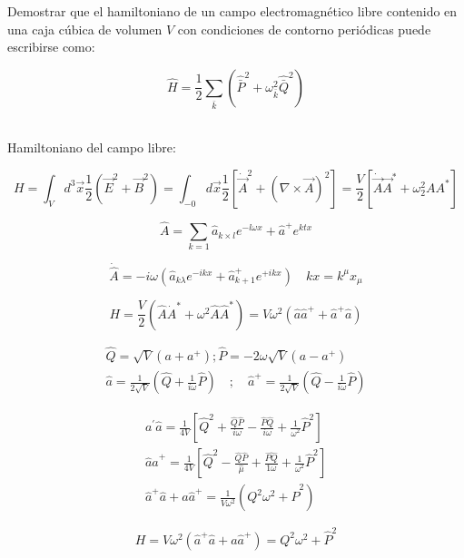 Demostrar  que  el  hamiltoniano  de  un  campo  electromagnético  libre  contenido  en  una  caja  cúbica  de volumen $V$ con condiciones de contorno periódicas puede escribirse como:

$$
\hat{H}=\frac{1}{2} \sum_{\bar{k}}\left(\hat{\bar{P}}^{2}+\omega_{\bar{k}}^{2} \hat{\bar{Q}}^{2}\right)
$$

\begin{solution}\ \\
Hamiltoniano del campo libre:

$$
H=\int_{V} d^{3} \vec{x} \frac{1}{2}\left(\vec{E}^{2}+\vec{B}^{2}\right)=\int_{-0} d \vec{x} \frac{1}{2}\left[\dot{\vec{A}}^{2}+(\nabla \times \vec{A})^{2}\right]=\frac{V}{2}\left[\dot{\vec{A}} \vec{A}^{*}+\omega_{2}^{2} A A^{*}\right]
$$

$$
\widehat{A}=\sum_{k=1} \hat{a}_{k \times l} e^{-l \omega x}+\hat{a}^{+} e^{k t x}
$$

$$
\dot{\hat{A}}=-i \omega\left(\hat{a}_{k \lambda} e^{-i k x}+\hat{a}_{k+1}^{+} e^{+i k x}\right) \quad k x=k^{\mu} x_{\mu}
$$

$$
H=\frac{V}{2}\left(\hat{A} \dot{A}^{*}+\omega^{2} \hat{A} \hat{A}^{*}\right)=V \omega^{2}\left(\hat{a} \hat{a}^{+}+\hat{a}^{+} \hat{a}\right)
$$

$$
\begin{array}{l}
{\hat{Q}=\sqrt{V}\left(a+a^{+}\right) ; \hat{P}=-2 \omega \sqrt{V}\left(a-a^{+}\right)} \\
{\hat{a}=\frac{1}{2 \sqrt{V}}\left(\hat{Q}+\frac{1}{i \omega} \hat{P}\right) \quad ; \quad \hat{a}^{+}=\frac{1}{2 \sqrt{V}}\left(\hat{Q}-\frac{1}{i \omega} \hat{P}\right)}
\end{array}
$$

$$
\begin{array}{l}
{a^{\prime} \hat{a}=\frac{1}{4 V}\left[\hat{Q}^{2}+\frac{\hat{Q} \hat{P}}{i \omega}-\frac{\hat{P} \hat{Q}}{i \omega}+\frac{1}{\omega^{2}} \hat{P}^{2}\right]} \\
{\hat{a} \hat{a}^{+}=\frac{1}{4 V}\left[\hat{Q}^{2}-\frac{\hat{Q} \hat{P}}{\hat{\mu}}+\frac{\hat{P Q}}{1 \omega}+\frac{1}{\omega^{2}} \hat{P}^{2}\right]} \\
{\hat{a}^{+} \hat{a}+a \hat{a}^{+}=\frac{1}{V \omega^{2}}\left(Q^{2} \omega^{2}+\hat{P}^{2}\right)}
\end{array}
$$

$$
\boxed{H=V \omega^{2}\left(\hat{a}^{+} \hat{a}+a \hat{a}^{+}\right)=Q^{2} \omega^{2}+\hat{P}^{2}}
$$
\end{solution}